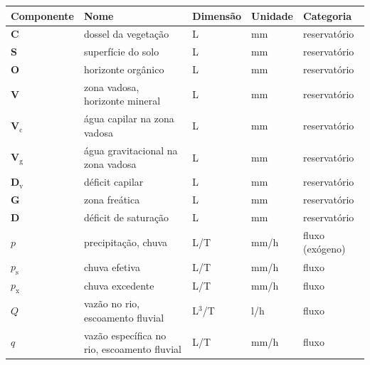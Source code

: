 \documentclass[./main.tex]{subfiles}
\begin{document}
{\renewcommand{\arraystretch}{1.5}%
\begin{table}[t!]
    \centering	
    \tiny
    \sffamily
    \begin{tabular}{ 
        >{\raggedright\arraybackslash}m{1cm}  
        >{\raggedright\arraybackslash}m{6cm}  
        >{\raggedright\arraybackslash}m{1cm}
        >{\raggedright\arraybackslash}m{1cm}
        >{\raggedright\arraybackslash}m{2cm}}
        \toprule
        \textbf{Componente} & \textbf{Nome} & \textbf{Dimensão} & \textbf{Unidade} & \textbf{Categoria} \\ 
        \midrule
        
        $\textbf{C}$ & dossel da vegetação & L & mm & reservatório \\ 
        $\textbf{S}$ & superfície do solo & L & mm & reservatório \\ 
        $\textbf{O}$ & horizonte orgânico & L & mm & reservatório \\ 
        $\textbf{V}$ & zona vadosa, horizonte mineral & L & mm & reservatório \\
        $\textbf{V}_{\text{c}}$ & água capilar na zona vadosa & L & mm & reservatório \\
        $\textbf{V}_{\text{g}}$ & água gravitacional na zona vadosa & L & mm & reservatório \\
        $\textbf{D}_\text{v}$ & déficit capilar & L & mm & reservatório \\
        $\textbf{G}$ & zona freática & L & mm & reservatório \\
        $\textbf{D}$ & déficit de saturação & L & mm & reservatório \\
        
        $p$ & precipitação, chuva & L/T & mm/h & fluxo (exógeno)\\
        $p_{\text{s}}$ & chuva efetiva & L/T & mm/h & fluxo\\
        $p_{\text{x}}$ & chuva excedente & L/T & mm/h & fluxo\\
        
        $Q$ & vazão no rio, escoamento fluvial & L$^{3}$/T & l/h & fluxo\\
        $q$ & vazão específica no rio, escoamento fluvial & L/T & mm/h & fluxo\\
        

\end{tabular}
\end{table}}
\end{document}
